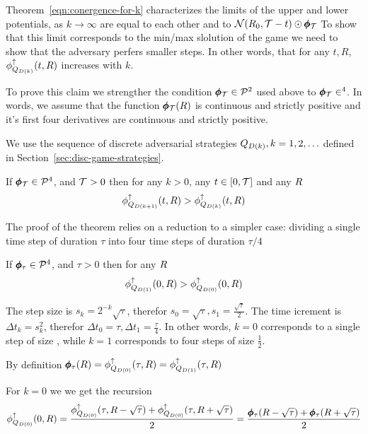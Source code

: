 \documentclass{article}[12pt]
\begin{document}
Theorem~\ref{eqn:conergence-for-k} characterizes the limits of the
upper and lower potentials, as $k \to \infty$ are equal to each other
and to ${\cal N}(R_0,\mathcal{T}-t) \odot \pmb{\phi}_{\mathcal{T}}$ To show that this
limit corresponds to the min/max slolution of the game we need to show
that the adversary perfers smaller steps. In other words, that
for any $t,R$, $\phi_{Q_{D(k)}}^{\uparrow}(t,R)$ increases with $k$.

To prove this claim we strengther the condition $\pmb{\phi}_{\mathcal{T}} \in {\cal P}^{2}$ used above to $\pmb{\phi}_{\mathcal{T}} \in \sp{4}$. In words, we assume that the function $\pmb{\phi}_{\mathcal{T}}(R)$ is continuous and strictly positive and it's first four derivatives are continuous and strictly positive.

We use the sequence of discrete adversarial strategies
$Q_{D(k)}, k=1,2,\ldots$ defined in
Section~\ref{sec:disc-game-strategies}.

\begin{theorem}\label{thm:smallerSteps}
  If $ \pmb{\phi}_{\mathcal{T}} \in {\cal P}^{4}$, and $\mathcal{T}>0$  
  then for any $k>0$, any $t \in [0,\mathcal{T}]$ and any $R$
  $$\phi_{Q_{D(k+1)}}^{\uparrow}(t,R) >  \phi_{Q_{D(k)}}^{\uparrow}(t,R)$$
\end{theorem}

The proof of the theorem relies on a reduction to a simpler case:
dividing a single time step of duration $\tau$ into four time steps of duration  $\tau/4$

\begin{lemma} \label{lemma:half-step}
  If $ \pmb{\phi}_{\tau} \in {\cal P}^{4}$, and $\tau>0$ then for any $R$
  $$\phi_{Q_{D(1)}}^{\uparrow}(0,R) >  \phi_{Q_{D(0)}}^{\uparrow}(0,R)$$
\end{lemma}
  
\proof The step size is $s_k=2^{-k}\sqrt{\tau}$, therefor
$s_0=\sqrt{\tau}, s_1=\frac{\sqrt{\tau}}{2}$. The time icrement is
$\Delta t_k = s_k^2$, therefor
$\Delta t_0=\tau, \Delta t_1=\frac{\tau}{4}$. In other words,
$k=0$ corresponds to a single step of size , while $k=1$ corresponds
to four steps of size $\frac{1}{2}$.

By definition $\pmb{\phi}_{\tau}(R)=\phi_{Q_{D(0)}}^{\uparrow}(\tau,R)=\phi_{Q_{D(1)}}^{\uparrow}(\tau,R)$

For $k=0$ we we get the recursion
\begin{equation}  \label{eqn:pot-recursion-0}
  \phi_{Q_{D(0)}}^{\uparrow}(0, R) =
  \frac{\phi_{Q_{D(0)}}^{\uparrow}(\tau,R-\sqrt{\tau})+
    \phi_{Q_{D(0)}}^{\uparrow}(\tau,R+\sqrt{\tau})}{2}
  =   \frac{\pmb{\phi}_{\tau}(R-\sqrt{\tau})+
    \pmb{\phi}_{\tau}(R+\sqrt{\tau})}{2}
\end{equation}
\end{document}
